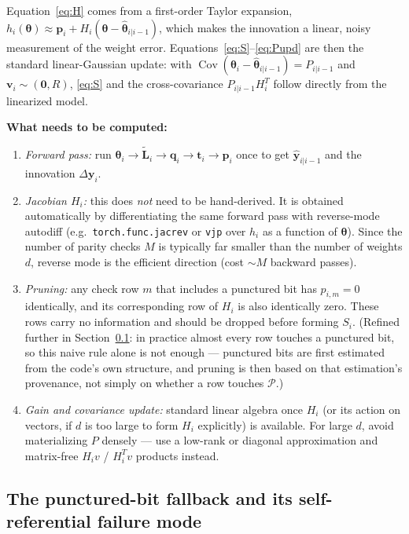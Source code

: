 \documentclass{article}
\newcommand{\state}{\boldsymbol{\theta}}
\begin{document}
Equation~\eqref{eq:H} comes from a first-order Taylor expansion,
$h_i(\state)\approx \mathbf{p}_i + H_i(\state-\hat{\state}_{i|i-1})$, which makes the
innovation a linear, noisy measurement of the weight error. Equations~\eqref{eq:S}--\eqref{eq:Pupd} are
then the standard linear-Gaussian update: with
$\operatorname{Cov}(\state_i-\hat{\state}_{i|i-1})=P_{i|i-1}$ and
$\mathbf{v}_i\sim(\mathbf{0},R)$, \eqref{eq:S} and the cross-covariance
$P_{i|i-1}H_i^T$ follow directly from the linearized model.

\textbf{What needs to be computed:}
\begin{enumerate}[itemsep=2pt]
  \item \emph{Forward pass:} run $\state_i \to \widetilde{\mathbf{L}}_i \to \mathbf{q}_i \to
  \mathbf{t}_i \to \mathbf{p}_i$ once to get $\hat{\mathbf{y}}_{i|i-1}$ and the innovation
  $\Delta\mathbf{y}_i$.
  \item \emph{Jacobian $H_i$:} this does \emph{not} need to be hand-derived. It is obtained
  automatically by differentiating the same forward pass with reverse-mode autodiff
  (e.g.\ \texttt{torch.func.jacrev} or \texttt{vjp} over $h_i$ as a function of $\state$).
  Since the number of parity checks $M$ is typically far smaller than the number of weights
  $d$, reverse mode is the efficient direction (cost $\sim M$ backward passes).
  \item \emph{Pruning:} any check row $m$ that includes a punctured bit has $p_{i,m}=0$
  identically, and its corresponding row of $H_i$ is also identically zero. These rows carry
  no information and should be dropped before forming $S_i$. (Refined further in
  Section~\ref{sec:fallback}: in practice almost every row touches a punctured bit, so this
  naive rule alone is not enough — punctured bits are first estimated from the code's own
  structure, and pruning is then based on that estimation's provenance, not simply on whether
  a row touches $\mathcal{P}$.)
  \item \emph{Gain and covariance update:} standard linear algebra once $H_i$ (or its action
  on vectors, if $d$ is too large to form $H_i$ explicitly) is available. For large $d$,
  avoid materializing $P$ densely — use a low-rank or diagonal approximation and matrix-free
  $H_i v$ / $H_i^T v$ products instead.
\end{enumerate}

\subsection{The punctured-bit fallback and its self-referential failure mode}
\label{sec:fallback}
\end{document}
